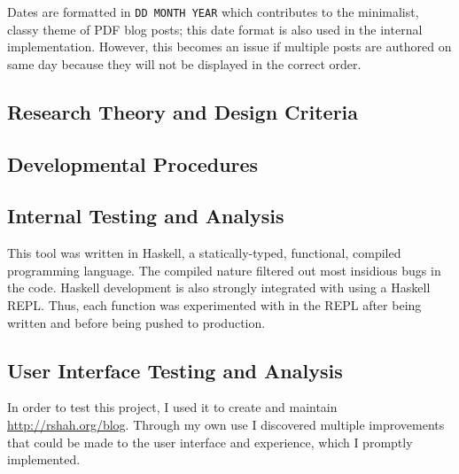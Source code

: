 \documentclass[doc,apacite,12pt]{apa6}
\begin{document}
Dates are formatted in \texttt{DD MONTH YEAR} which contributes to the minimalist, classy theme of PDF blog posts; this date format is also used in the internal implementation. However, this becomes an issue if multiple posts are authored on same day because they will not be displayed in the correct order. 

\subsection{Research Theory and Design Criteria}

\subsection{Developmental Procedures}


\subsection{Internal Testing and Analysis}
This tool was written in Haskell, a statically-typed, functional, compiled programming language. The compiled nature filtered out most insidious bugs in the code. Haskell development is also strongly integrated with using a Haskell REPL. Thus, each function was experimented with in the REPL after being written and before being pushed to production. 

\subsection{User Interface Testing and Analysis}
In order to test this project, I used it to create and maintain \url{http://rshah.org/blog}. Through my own use I discovered multiple improvements that could be made to the user interface and experience, which I promptly implemented. 
\end{document}
